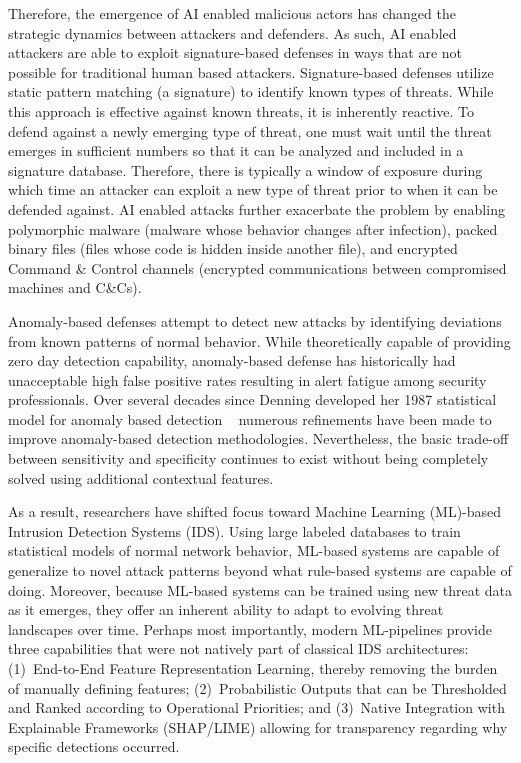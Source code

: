 Therefore, the emergence of AI enabled malicious actors has changed the strategic dynamics between attackers and defenders. As such, AI enabled attackers are able to exploit signature-based defenses in ways that are not possible for traditional human based attackers. Signature-based defenses utilize static pattern matching (a signature) to identify known types of threats. While this approach is effective against known threats, it is inherently reactive. To defend against a newly emerging type of threat, one must wait until the threat emerges in sufficient numbers so that it can be analyzed and included in a signature database. Therefore, there is typically a window of exposure during which time an attacker can exploit a new type of threat prior to when it can be defended against. AI enabled attacks further exacerbate the problem by enabling polymorphic malware (malware whose behavior changes after infection), packed binary files (files whose code is hidden inside another file), and encrypted Command & Control channels (encrypted communications between compromised machines and C&Cs).

Anomaly-based defenses attempt to detect new attacks by identifying deviations from known patterns of normal behavior. While theoretically capable of providing zero day detection capability, anomaly-based defense has historically had unacceptable high false positive rates resulting in alert fatigue among security professionals. Over several decades since Denning developed her 1987 statistical model for anomaly based detection ~\cite{sommer2010outside} numerous refinements have been made to improve anomaly-based detection methodologies. Nevertheless, the basic trade-off between sensitivity and specificity continues to exist without being completely solved using additional contextual features.

As a result, researchers have shifted focus toward Machine Learning (ML)-based Intrusion Detection Systems (IDS). Using large labeled databases to train statistical models of normal network behavior, ML-based systems are capable of generalize to novel attack patterns beyond what rule-based systems are capable of doing. Moreover, because ML-based systems can be trained using new threat data as it emerges, they offer an inherent ability to adapt to evolving threat landscapes over time. Perhaps most importantly, modern ML-pipelines provide three capabilities that were not natively part of classical IDS architectures: (1)~End-to-End Feature Representation Learning, thereby removing the burden of manually defining features; (2)~Probabilistic Outputs that can be Thresholded and Ranked according to Operational Priorities; and (3)~Native Integration with Explainable Frameworks (SHAP/LIME) allowing for transparency regarding why specific detections occurred.

